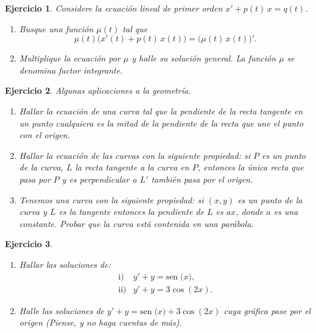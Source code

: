 \documentclass[11pt,a4paper,pdftex]{amsart}
\newtheorem{ej}{Ejercicio}%
\numberwithin{equation}{section}%
\newcommand{\bej}[1]{\begin{ej}\rm{#1}}
\newcommand{\eej}{\end{ej}\vspace{-0.2cm}}
\newcommand{\0}{\mathbb O}
\newcommand{\8}{\infty}
\newcommand{\sen}[1]{\mbox{sen}\;{#1}}
\begin{document}
\bej Considere la ecuación lineal de primer orden
$x'+p(t)\,x=q(t)$.
\begin{enumerate}
\item Busque una función $\mu(t)$ tal que
$$
\mu(t)\big(x'(t)+p(t)\,x(t)\big)=\big(\mu(t)\,x(t)\big)'.
$$

\item Multiplique la ecuación por $\mu$ y halle su solución 
general. La función $\mu$ se denomina {\it factor integrante}.
\end{enumerate}

\eej

\bigskip

\bej 
Algunas aplicaciones a la geometría.
\begin{enumerate}
\item Hallar la ecuaci\'on de una curva tal que la pendiente de la
recta tangente en un punto cualquiera es la mitad de la
pendiente de la recta que une el punto con el origen.

\item Hallar la ecuaci\'on de las curvas con la siguiente propiedad: si $P$ es 
un punto de la curva, $L$ la recta tangente a la curva en $P$, entonces la 
única recta que pasa por $P$ y es perpendicular a $L'$ también pasa por el 
origen.

\item Tenemos una curva con la siguiente propiedad: si $(x,y)$ es un punto de 
la curva y $L$ es la tangente entonces la pendiente de $L$ es $a x$, donde $a$
es una constante. Probar que la curva está contenida en una parábola. 
\end{enumerate}
\eej




 \bej\ \ \newline

\begin{enumerate}
\item Hallar las soluciones de:
\[
\begin{array}{ll}
\mbox{i)}&y'+y= \sen(x), \\
\mbox{ii)}&y'+y=3 \cos(2x).
\end{array}
\]

\item Halle las soluciones de $ y'+y=\sen(x) +3 \cos(2x)  $
cuya gr\'afica pase por el origen (Piense, y no haga cuentas de m\'as).
\end{enumerate}
\eej
\bigskip
\end{document}
